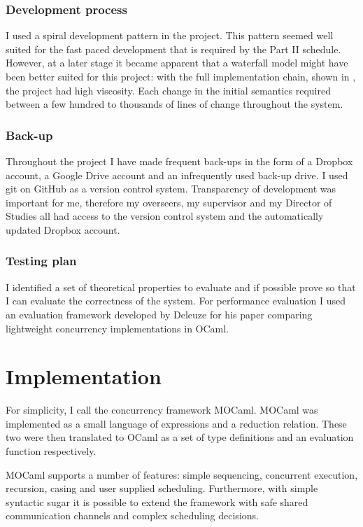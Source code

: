 \documentclass[12pt,twoside,notitlepage]{report}
\theoremstyle{plain}%
\theoremstyle{definition}
\theoremstyle{remark}
\begin{document}
\subsection{Development process}
I used a spiral development pattern in the project. This pattern seemed well suited for the fast paced development that is required by the Part II schedule. However, at a later stage it became apparent that a waterfall model might have been better suited for this project: with the full implementation chain, shown in , the project had high viscosity. Each change in the initial semantics required between a few hundred to thousands of lines of change throughout the system. 
\subsection{Back-up}
Throughout the project I have made frequent back-ups in the form of a Dropbox account, a Google Drive account and an infrequently used back-up drive. I used git on GitHub as a version control system. Transparency of development was important for me, therefore my overseers, my supervisor and my Director of Studies all had access to the version control system and the automatically updated Dropbox account.
\subsection{Testing plan}
I identified a set of theoretical properties to evaluate and if possible prove so that I can evaluate the correctness of the system. For performance evaluation I used an evaluation framework developed by Deleuze for his paper comparing lightweight concurrency implementations in OCaml\cite{deleuzelight}.

\cleardoublepage
\chapter{Implementation}
For simplicity, I call the concurrency framework MOCaml. MOCaml was implemented as a small language of expressions and a reduction relation.  These two were then translated to OCaml as a set of type definitions and an evaluation function respectively. 

MOCaml supports a number of features: simple sequencing, concurrent execution, recursion, casing and user supplied scheduling. Furthermore, with simple syntactic sugar it is possible to extend the framework with safe shared communication channels and complex scheduling decisions. 
\end{document}
